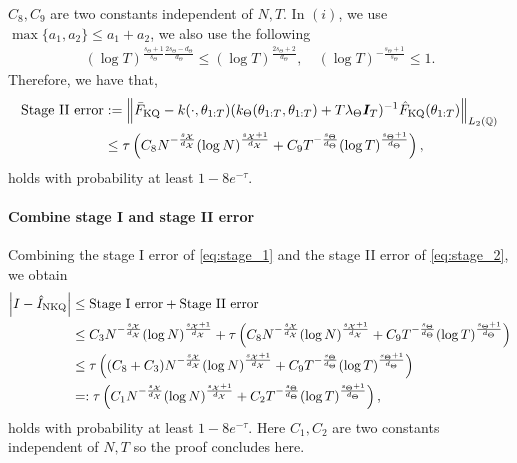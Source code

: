 $C_8, C_9$ are two constants independent of $N,T$.
In $(i)$, we use $\max\{ a_1, a_2\}\leq a_1 + a_2$, we also use the following
\begin{align*}
    (\log T)^{\frac{s_\Theta+1}{s_\Theta} \frac{2s_\Theta-d_\Theta}{d_\Theta}} \leq (\log T)^{\frac{2s_\Theta+2}{d_\Theta}} , \quad (\log T)^{-\frac{s_\Theta+1}{s_\Theta}} \leq 1 .
\end{align*}
Therefore, we have that, 
\begin{align}\label{eq:stage_2}
    \text{Stage II error} &:= \left\| \bar{F}_{\text{KQ}} - k(\cdot, \theta_{1:T}) (k_\Theta(\theta_{1:T}, \theta_{1:T}) + T \lambda_\Theta \boldsymbol{I}_T )^{-1} 
    \hat{F}_{\text{KQ}}(\theta_{1:T}) \right\|_{L_2( \mathbb{Q} ) } \nonumber \\
    &\leq \tau \left( C_8 N^{- \frac{ s_{\mathcal{X}}}{d_{\mathcal{X}}}} (\log N)^{\frac{s_{\mathcal{X}}+1}{d_{\mathcal{X}}}} + C_9 T^{- \frac{ s_\Theta}{d_\Theta}} (\log T)^{\frac{s_\Theta+1}{d_\Theta}} \right) ,
\end{align}
holds with probability at least $1 - 8 e^{-\tau}$.
\paragraph{Combine stage I and stage II error}
Combining the stage I error of \eqref{eq:stage_1} and the stage II error of \eqref{eq:stage_2}, we obtain
\begin{align*}
    \left| I - \hat{I}_{\text{NKQ}} \right| &\leq \text{Stage I error} + \text{Stage II error} \\
    &\leq C_3 N^{-\frac{ s_{\mathcal{X}}}{d_{\mathcal{X}}}} (\log N)^{\frac{s_{\mathcal{X}}+1}{d_{\mathcal{X}}}} + \tau \left( C_8 N^{- \frac{ s_{\mathcal{X}}}{d_{\mathcal{X}}} } (\log N)^{\frac{s_{\mathcal{X}}+1}{d_{\mathcal{X}}}} + C_9 T^{- \frac{ s_\Theta}{d_\Theta}} (\log T)^{\frac{s_\Theta+1}{d_\Theta}} \right) \\
    &\leq \tau \left( (C_8 + C_3) N^{- \frac{ s_{\mathcal{X}}}{d_{\mathcal{X}}} } (\log N)^{\frac{s_{\mathcal{X}}+1}{d_{\mathcal{X}}}} + C_9 T^{- \frac{ s_\Theta}{d_\Theta} }  (\log T)^{\frac{s_\Theta+1}{d_\Theta}} \right) \\
    &=: \tau \left( C_1 N^{- \frac{ s_{\mathcal{X}}}{d_{\mathcal{X}}} } (\log N)^{\frac{s_{\mathcal{X}}+1}{d_{\mathcal{X}}}} + C_2 T^{- \frac{ s_\Theta}{d_\Theta} } (\log T)^{\frac{s_\Theta+1}{d_\Theta}} \right), 
\end{align*}
holds with probability at least $1 - 8 e^{-\tau}$.
Here $C_1, C_2$ are two constants independent of $N,T$ so the proof concludes here.


